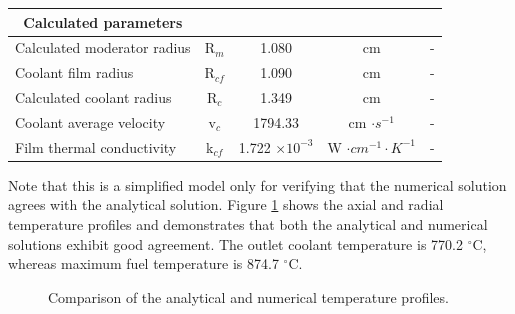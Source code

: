 \begin{table}[htbp!]
\begin{tabular}{@{}l c c c c}
    \midrule
  \multicolumn{1}{c}{Calculated parameters} &  &  &  & \\  
    \midrule
  Calculated moderator radius  & R$_m$ & 1.080  	& cm    & - \\
  Coolant film radius   		   & R$_{cf}$ & 1.090  	& cm    & - \\
  Calculated coolant radius 	 & R$_c$ & 1.349  	& cm    & - \\
  Coolant average velocity  	 & v$_c$ & 1794.33 	& cm $\cdot s^{-1}$ & - \\
  Film thermal conductivity  	 & k$_{cf}$ & 1.722 $\times 10^{-3}$ & W $\cdot cm^{-1} \cdot K^{-1}$ & - \\
  \bottomrule
  \end{tabular}
\end{table}

Note that this is a simplified model only for verifying that the numerical solution agrees with the analytical solution.
Figure \ref{fig:th-ver-results} shows the axial and radial temperature profiles and demonstrates that both the analytical and numerical solutions exhibit good agreement.
The outlet coolant temperature is 770.2 $^{\circ}$C, whereas maximum fuel temperature is 874.7 $^{\circ}$C.

\begin{figure}[htbp!]
	\centering
	\hfill
    \caption{Comparison of the analytical and numerical temperature profiles.}
	\label{fig:th-ver-results}
\end{figure}

